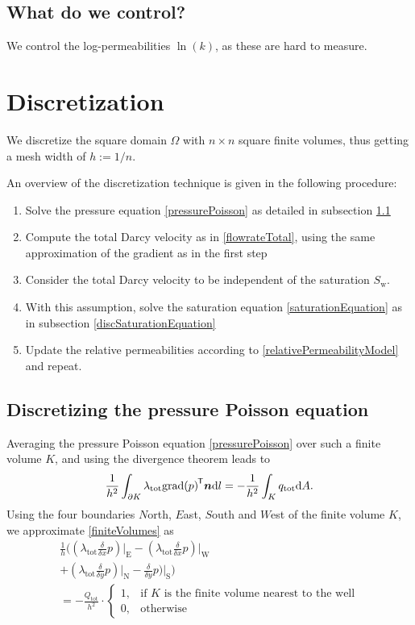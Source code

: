 \documentclass[conference]{IEEEtran}
\DeclareMathOperator*{\grad}{grad}
\renewcommand*{\d}[1]{\ensuremath{\mathrm{d}#1}}
\newcommand*{\ddiff}[2]{\ensuremath{\frac{\delta}{\delta{#2}}{#1}}}
\renewcommand*{\vec}[1]{\ensuremath{{\bm{#1}}}}
\newcommand*{\transpose}[1]{{#1}^{\mkern-1.5mu\mathsf{T}}}
\newcommand*{\iprod}[3]{\ensuremath{\ifstrempty{#1}{\transpose{#2} {#3}}{\transpose{#1} {#2} {#3}}}}
\begin{document}
\subsection{What do we control?}
We control the log-permeabilities $\ln(k)$, as these are hard to measure.

\section{Discretization}
We discretize the square domain $\Omega$ with $n \times n$ square finite volumes, thus getting a mesh width of $h := 1/n$.

An overview of the discretization technique is given in the following procedure:
\begin{enumerate}
	\item Solve the pressure equation \eqref{pressurePoisson} as detailed in subsection \ref{discPressurePoisson}
	\item Compute the total Darcy velocity as in \eqref{flowrateTotal}, using the same approximation of the gradient as in the first step
	\item Consider the total Darcy velocity to be independent of the saturation $S_\text{w}.$
	\item With this assumption, solve the saturation equation \eqref{saturationEquation} as in subsection \ref{discSaturationEquation}
	\item Update the relative permeabilities according to \eqref{relativePermeabilityModel} and repeat.
\end{enumerate}

\subsection{Discretizing the pressure Poisson equation}
\label{discPressurePoisson}
Averaging the pressure Poisson equation \eqref{pressurePoisson} over such a finite volume $K$, and using the divergence theorem leads to
\begin{equation}
\label{finiteVolumes}
\frac{1}{h^2} \int_{\partial K} \lambda_\text{tot} \iprod{}{\grad(p)}{\vec{n}} \d{l} = -\frac{1}{h^2} \int_K q_\text{tot} \d{A}.
\end{equation}
Using the four boundaries $N$orth, $E$ast, $S$outh and $W$est of the finite volume $K$, we approximate \eqref{finiteVolumes} as
\begin{multline}
\frac{1}{h}\biggr( (\lambda_\text{tot} \ddiff{p}{x})\lvert_\text{E} - (\lambda_\text{tot} \ddiff{p}{x})\lvert_\text{W} \\+ (\lambda_\text{tot}\ddiff{p}{y})\lvert_\text{N}
- \ddiff{p}{y})\lvert_\text{S} \biggr) \\= - \frac{Q_\text{tot}}{h^2} \cdot \begin{cases} 1, &\text{if } K \text{ is the finite volume nearest to the well} \\
0, & \text{otherwise} \end{cases}
\end{multline}
\end{document}
